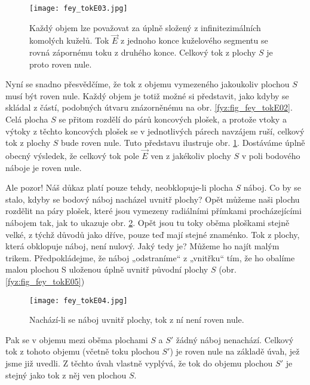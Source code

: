     \begin{figure}[ht!]
      \centering
      \texttt{[image: fey\_tokE03.jpg]}
      \caption{Každý objem lze považovat za úplně složený z infinitezimálních komolých kuželů. Tok 
               \(\vec{E}\) z jednoho konce kuželového segmentu se rovná zápornému toku z druhého 
               konce. Celkový tok z plochy \(S\) je proto roven nule.}
      \label{fyz:fig_fey_tokE03} 
    \end{figure}                         

    Nyní se snadno přesvědčíme, že tok z objemu vymezeného jakoukoliv plochou \(S\) musí být roven 
    nule. Každý objem je totiž možné si představit, jako kdyby se skládal z částí, podobných útvaru 
    znázorněnému na obr. \ref{fyz:fig_fey_tokE02}. Celá plocha \(S\) se přitom rozdělí do párů 
    koncových plošek, a protože vtoky a výtoky z těchto koncových plošek se v jednotlivých párech 
    navzájem ruší, celkový tok z plochy \(S\) bude roven nule. Tuto představu ilustruje obr. 
    \ref{fyz:fig_fey_tokE03}. Dostáváme úplně obecný výsledek, že celkový tok pole \(\vec{E}\) ven z 
    jakékoliv plochy \(S\) v poli bodového náboje je roven nule. 
                     
    Ale pozor! Náš důkaz platí pouze tehdy, neobklopuje-li plocha \(S\) náboj. Co by se stalo, kdyby 
    se bodový náboj nacházel uvnitř plochy? Opět můžeme naši plochu rozdělit na páry plošek, které 
    jsou vymezeny radiálními přímkami procházejícími nábojem tak, jak to ukazuje obr. 
    \ref{fyz:fig_fey_tokE04}. Opět jsou tu toky  oběma ploškami stejně velké, z týchž důvodů jako 
    dříve, pouze teď mají stejné znaménko. Tok z plochy, která obklopuje náboj, není nulový. Jaký 
    tedy je? Můžeme ho najít malým trikem. Předpokládejme, že náboj „odstraníme“ z „vnitřku“ tím, že 
    ho obalíme malou plochou S uloženou úplně uvnitř původní plochy \(S\) (obr. 
    \ref{fyz:fig_fey_tokE05})           

    \begin{figure}[ht!]
      \centering                  
      \texttt{[image: fey\_tokE04.jpg]}
      \caption{Nachází-li se náboj uvnitř plochy, tok z ní není roven nule.}
      \label{fyz:fig_fey_tokE04}  
    \end{figure}        
   
    Pak se v objemu mezi oběma plochami \(S\) a \(S'\) žádný náboj nenachází. Celkový tok z tohoto 
    objemu (včetně toku plochou \(S'\)) je roven nule na základě úvah, jež jsme již uvedli. Z těchto 
    úvah vlastně vyplývá, že tok do objemu plochou \(S'\) je stejný jako tok z něj ven plochou 
    \(S\).
        
